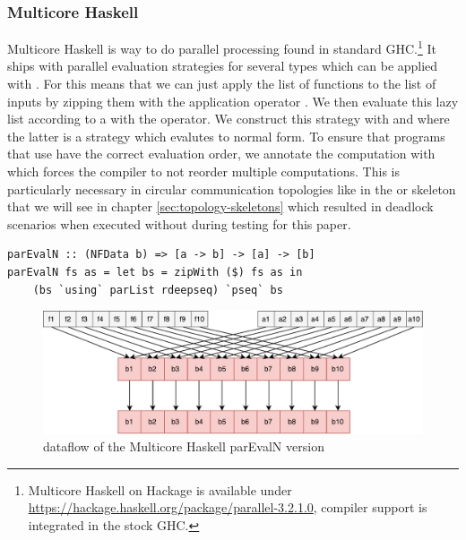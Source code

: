 \subsubsection{Multicore Haskell}
Multicore Haskell \cite{Marlow2009,Trinder1999} is way to do parallel processing found in standard GHC.\footnote{Multicore Haskell on Hackage is available under \url{https://hackage.haskell.org/package/parallel-3.2.1.0}, compiler support is integrated in the stock GHC.} It ships with parallel evaluation strategies \cite{Trinder1998a,Marlow2010} for several types which can be applied with . For  this means that we can just apply the list of functions \code{[a -> b]} to the list of inputs \code{[a]} by zipping them with the application operator \code{\$}. We then evaluate this lazy list \code{[b]} according to a  with the  operator. We construct this strategy with  and  where the latter is a strategy which evalutes to normal form. To ensure that programs that use  have the correct evaluation order, we annotate the computation with  which forces the compiler to not reorder multiple  computations. This is particularly necessary in circular communication topologies like in the  or  skeleton that we will see in chapter \ref{sec:topology-skeletons} which resulted in deadlock scenarios when executed without  during testing for this paper.

\begin{lstlisting}[frame=htrbl]
parEvalN :: (NFData b) => [a -> b] -> [a] -> [b]
parEvalN fs as = let bs = zipWith ($) fs as in
	(bs `using` parList rdeepseq) `pseq` bs
\end{lstlisting}
\begin{figure}[h]
	\includegraphics[scale=0.5]{images/parEvalNMulticore}
	\caption{dataflow of the Multicore Haskell parEvalN version}
\end{figure} %

